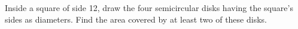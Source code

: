 Inside a square of side 12, draw the four semicircular disks having the square's sides as diameters. Find the area covered by at least two of these disks.
